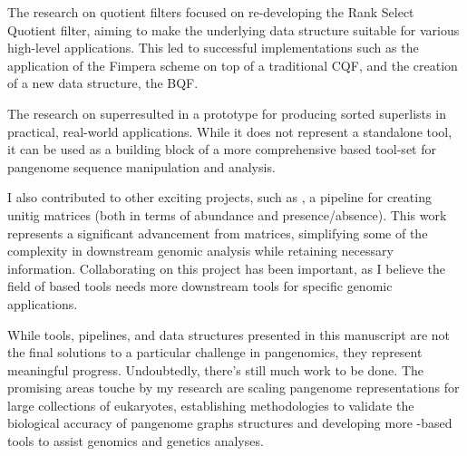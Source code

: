 The research on quotient filters focused on re-developing the Rank Select Quotient filter, aiming to make the underlying data structure suitable for various high-level applications. This led to successful implementations such as the application of the Fimpera scheme on top of a traditional CQF, and the creation of a new data structure, the BQF.

The research on super\kmers resulted in a prototype for producing sorted super\kmer lists in practical, real-world applications. While it does not represent a standalone tool, it can be used as a building block of a more comprehensive \kmer based tool-set for pangenome sequence manipulation and analysis.

I also contributed to other exciting projects, such as \muset, a pipeline for creating unitig matrices (both in terms of abundance and presence/absence). This work represents a significant advancement from \kmer matrices, simplifying some of the complexity in downstream genomic analysis while retaining necessary information. Collaborating on this project has been important, as I believe the field of \kmer based tools needs more downstream tools for specific genomic applications.

While tools, pipelines, and data structures presented in this manuscript are not the final solutions to a particular challenge in pangenomics, they represent meaningful progress. Undoubtedly, there’s still much work to be done. The promising areas touche by my research are scaling pangenome representations for large collections of eukaryotes, establishing methodologies to validate the biological accuracy of pangenome graphs structures and developing more \kmer-based tools to assist genomics and genetics analyses.

